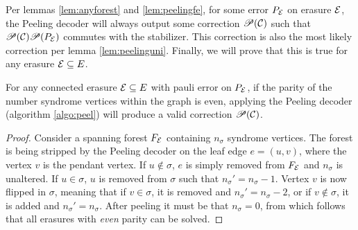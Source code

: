 Per lemmas \ref{lem:anyforest} and \ref{lem:peelingfe}, for some error $P_{\mathcal{E}}$ on erasure $\mathcal{E}$, the Peeling decoder will always output some correction $\mathscr{P}(\mathcal{C})$ such that $\mathscr{P}(\mathcal{C})\mathscr{P}(P_{\mathcal{E}})$ commutes with the stabilizer. This correction is also the most likely correction per lemma \ref{lem:peelinguni}. Finally, we will prove that this is true for any erasure $\mathcal{E}\subseteq E$.
\begin{theorem}\label{the:anyevenparity}
  For any connected erasure $\mathcal{E}\subseteq E$ with pauli error on $P_{\mathcal{E}}$, if the parity of the number syndrome vertices within the graph is even, applying the Peeling decoder (algorithm \ref{algo:peel}) will produce a valid correction $\mathscr{P}(\mathcal{C})$.
\end{theorem}
\begin{proof}
  Consider a spanning forest $F_{\mathcal{E}}$ containing $n_\sigma$ syndrome vertices. The forest is being stripped by the Peeling decoder on the leaf edge $e = (u,v)$, where the vertex $v$ is the pendant vertex. If $u\notin\sigma$, $e$ is simply removed from $F_{\mathcal{E}}$ and $n_\sigma$ is unaltered. If $u\in\sigma$, $u$ is removed from $\sigma$ such that $n_\sigma'= n_\sigma -1$. Vertex $v$ is now flipped in $\sigma$, meaning that if $v\in\sigma$, it is removed and $n_\sigma'= n_\sigma -2$, or if  $v\notin\sigma$, it is added and $n_\sigma'= n_\sigma$. After peeling it must be that $n_\sigma=0$, from which follows that all erasures with \emph{even} parity can be solved.
\end{proof}

